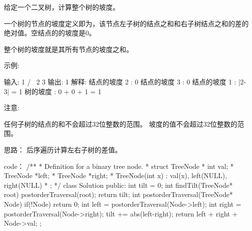 给定一个二叉树，计算整个树的坡度。

一个树的节点的坡度定义即为，该节点左子树的结点之和和右子树结点之和的差的绝对值。空结点的的坡度是0。

整个树的坡度就是其所有节点的坡度之和。

示例:

输入: 
         1
       /   \
      2     3
输出: 1
解释: 
结点的坡度 2 : 0
结点的坡度 3 : 0
结点的坡度 1 : |2-3| = 1
树的坡度 : 0 + 0 + 1 = 1

注意:

    任何子树的结点的和不会超过32位整数的范围。
    坡度的值不会超过32位整数的范围。


















思路：
后序遍历计算左右子树的差值。

















code：
/**
 * Definition for a binary tree node.
 * struct TreeNode {
 *     int val;
 *     TreeNode *left;
 *     TreeNode *right;
 *     TreeNode(int x) : val(x), left(NULL), right(NULL) {}
 * };
 */
class Solution {
public:
    int tilt = 0;
    int findTilt(TreeNode* root) {
        postorderTraversal(root);
        return tilt;
    }
    int postorderTraversal(TreeNode* Node)
    {
        if(!Node) return 0;
        int left = postorderTraversal(Node->left);
        int right = postorderTraversal(Node->right);
        tilt += abs(left-right);
        return left + right + Node->val;
    }
};